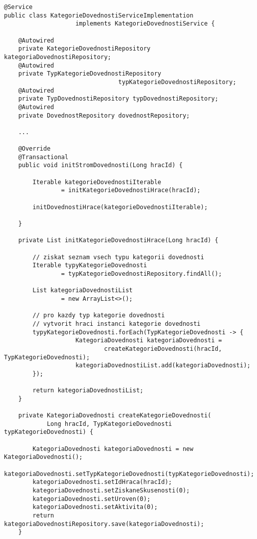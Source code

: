\documentclass[twoside, 12pt]{article}
\begin{document}
{{\vspace{50}


\begin{lstlisting}
@Service
public class KategorieDovednostiServiceImplementation
                    implements KategorieDovednostiService {

    @Autowired
    private KategorieDovednostiRepository kategoriaDovednostiRepository;
    @Autowired
    private TypKategorieDovednostiRepository
                                typKategorieDovednostiRepository;
    @Autowired
    private TypDovednostiRepository typDovednostiRepository;
    @Autowired
    private DovednostRepository dovednostRepository;

    ...

    @Override
    @Transactional
    public void initStromDovednosti(Long hracId) {

        Iterable kategorieDovednostiIterable
                = initKategorieDovednostiHrace(hracId);

        initDovednostiHrace(kategorieDovednostiIterable);

    }

    private List initKategorieDovednostiHrace(Long hracId) {

        // ziskat seznam vsech typu kategorii dovednosti
        Iterable typyKategorieDovednosti
                = typKategorieDovednostiRepository.findAll();

        List kategoriaDovednostiList
                = new ArrayList<>();

        // pro kazdy typ kategorie dovednosti
        // vytvorit hraci instanci kategorie dovednosti
        typyKategorieDovednosti.forEach(TypKategorieDovednosti -> {
                    KategoriaDovednosti kategoriaDovednosti =
                            createKategorieDovednosti(hracId, TypKategorieDovednosti);
                    kategoriaDovednostiList.add(kategoriaDovednosti);
        });

        return kategoriaDovednostiList;
    }

    private KategoriaDovednosti createKategorieDovednosti(
            Long hracId, TypKategorieDovednosti typKategorieDovednosti) {

        KategoriaDovednosti kategoriaDovednosti = new KategoriaDovednosti();
        kategoriaDovednosti.setTypKategorieDovednosti(typKategorieDovednosti);
        kategoriaDovednosti.setIdHraca(hracId);
        kategoriaDovednosti.setZiskaneSkusenosti(0);
        kategoriaDovednosti.setUroven(0);
        kategoriaDovednosti.setAktivita(0);
        return kategoriaDovednostiRepository.save(kategoriaDovednosti);
    }


\end{lstlisting}}}
\end{document}
